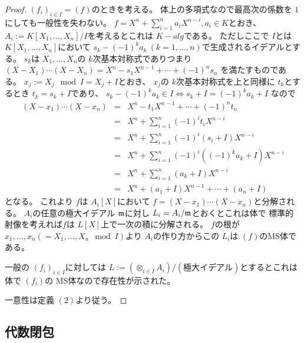 \documentclass[../master_galois_theory]{subfiles}
\begin{document}
\begin{proof}
  $(f_i)_{i \in I} = (f)$のときを考える。
  体上の多項式なので最高次の係数を $1$にしても一般性を失わない。
  $f = X^n + \sum_{i = 1}^n a_i X^{n-i} , a_i \in K$とおき、
  $A_i := K[X_1 , \dots , X_n]/ I$を考えるとこれは $K-alg$である。
  ただしここで $I$とは $K[X_1 , \dots , X_n]$において
  $s_k - (-1)^k a_k \  (k = 1 , \dots , n)$で生成されるイデアルとする。
  $s_k$は $X_1 , \dots , X_n$の $k$次基本対称式でありつまり
  $(X - X_1) \cdots (X - X_n) = X^n - s_1 X^{n-1} + \cdots + (-1)^n s_n$
  を満たすものである。
  $x_j := X_j \mod I = X_j + I$とおき、 $x_j$の $k$次基本対称式を上と同様に $t_k$とするとき
  $t_k = s_k + I$であり、
  $s_k - (-1)^k a_k \in I \Leftrightarrow s_k + I = (-1)^k a_k + I$
  なので
  \begin{eqnarray*}
    (X - x_1) \cdots (X - x_n) & = & X^n - t_1 X^{n-1} + \cdots + (-1)^n t_n \\
    & = & X^n + \sum_{i=1}^n (-1)^i t_i X^{n-i} \\
    & = & X^n + \sum_{i=1}^n (-1)^i (s_i + I) X^{n-i} \\
    & = & X^n + \sum_{i=1}^n (-1)^i ((-1)^k a_k + I) X^{n-i} \\
    & = & X^n + \sum_{i=1}^n (a_k + I) X^{n-i} \\
    & = & X^n + (a_1 + I) X^{n-1} + \cdots + (a_n + I)
  \end{eqnarray*}
  となる。
  これより $f$は $A_i[X]$において $f = (X - x_1) \cdots (X - x_n)$と分解される。
  $A_i$の任意の極大イデアル $\mathfrak{m}$に対し $L_i = A_i/\mathfrak{m}$とおくとこれは体で
  標準的射像を考えれば$f$は $L[X]$上で一次の積に分解される。
  $f$の根が $x_1 , \dots , x_n (= X_1 , \dots , X_n \mod I)$より
  $A_i$の作り方からこの $L_i$は $(f)$の\rm{MS}体である。

  一般の $(f_i)_{i \in I}$に対しては
  $L := (\otimes_{i \in I} A_i) / (極大イデアル)$とするとこれは体で
  $(f_i)$の \rm{MS}体なので存在性が示された。

  一意性は定義 $(2)$より従う。
\end{proof}

\subsection{代数閉包}
\end{document}
